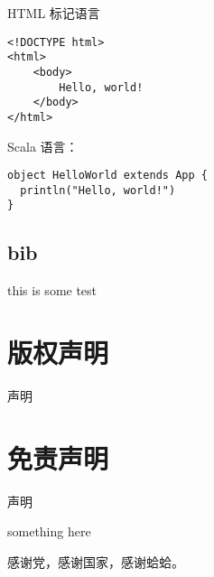 \documentclass[%
               print, 
               timesmath
              ]{xjtubsc}
\begin{document}
HTML 标记语言
\begin{verbatim}
<!DOCTYPE html>
<html>
    <body>
        Hello, world!
    </body>
</html>
\end{verbatim}

Scala  语言：
\begin{verbatim}
object HelloWorld extends App {
  println("Hello, world!")
}
\end{verbatim}

\subsection{bib}

this is some test\cite{IEEE-1363,Krasnogor2004e}
\section{版权声明}
声明

\section{免责声明}
声明

\backmatter

\nocite{*}




something here



\begin{acknowledgment}
感谢党，感谢国家，感谢蛤蛤。
\end{acknowledgment}
\end{document}
